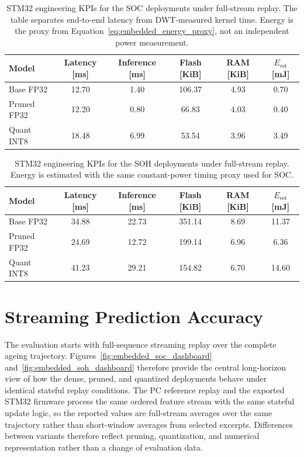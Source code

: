 \documentclass[
    a4paper,
    12pt,
    titlepage,
    bibliography=totoc,
    twoside=on,
    parskip=false,
    numbers=noenddot,
    cleardoublepage=empty,
    DIV=12,
    BCOR=12.0mm,
    headheight=36pt,
    headings=openright
]{scrreprt}
\begin{document}
\begin{table}[H]
    \centering
    \caption[STM32 KPIs for SOC deployments.]{STM32 engineering KPIs for the SOC deployments under full-stream replay. The table separates end-to-end latency from DWT-measured kernel time. Energy is the proxy from Equation~\ref{eq:embedded_energy_proxy}, not an independent power measurement.}
    \label{tab:embedded_soc_kpi}
    \begin{tabular}{@{}lccccc@{}}
        \toprule
        Model & Latency [ms] & Inference [ms] & Flash [KiB] & RAM [KiB] & $E_{\mathrm{est}}$ [mJ] \\
        \midrule
        Base FP32 & 12.70 & 1.40 & 106.37 & 4.93 & 0.70 \\
        Pruned FP32 & 12.20 & 0.80 & 66.83 & 4.03 & 0.40 \\
        Quant INT8 & 18.48 & 6.99 & 53.54 & 3.96 & 3.49 \\
        \bottomrule
    \end{tabular}
\end{table}

\begin{table}[H]
    \centering
    \caption[STM32 KPIs for SOH deployments.]{STM32 engineering KPIs for the SOH deployments under full-stream replay. Energy is estimated with the same constant-power timing proxy used for SOC.}
    \label{tab:embedded_soh_kpi}
    \begin{tabular}{@{}lccccc@{}}
        \toprule
        Model & Latency [ms] & Inference [ms] & Flash [KiB] & RAM [KiB] & $E_{\mathrm{est}}$ [mJ] \\
        \midrule
        Base FP32 & 34.88 & 22.73 & 351.14 & 8.69 & 11.37 \\
        Pruned FP32 & 24.69 & 12.72 & 199.14 & 6.96 & 6.36 \\
        Quant INT8 & 41.23 & 29.21 & 154.82 & 6.70 & 14.60 \\
        \bottomrule
    \end{tabular}
\end{table}

\section{Streaming Prediction Accuracy}
The evaluation starts with full-sequence streaming replay over the complete ageing trajectory. Figures~\ref{fig:embedded_soc_dashboard} and~\ref{fig:embedded_soh_dashboard} therefore provide the central long-horizon view of how the dense, pruned, and quantized deployments behave under identical stateful replay conditions. The PC reference replay and the exported STM32 firmware process the same ordered feature stream with the same stateful update logic, so the reported values are full-stream averages over the same trajectory rather than short-window averages from selected excerpts. Differences between variants therefore reflect pruning, quantization, and numerical representation rather than a change of evaluation data.
\end{document}
